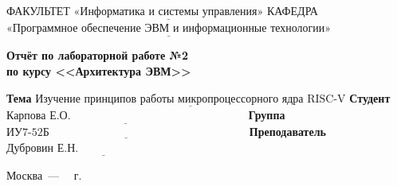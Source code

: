 \begin{titlepage}
	
	\noindent ФАКУЛЬТЕТ $\underline{\text{«Информатика и системы управления»}}$ \newline\newline
	\noindent КАФЕДРА $\underline{\text{«Программное обеспечение ЭВМ и информационные технологии»}}$\newline\newline\newline\newline\newline\newline\newline
	
	\vspace{\baselineskip}
	
	\begin{center}
		\noindent\begin{minipage}{0.81\textwidth}\centering
			\Large\textbf{Отчёт по лабораторной работе №2\\по курсу <<Архитектура ЭВМ>>}\newline\newline
		\end{minipage}
	\end{center}
	
	\noindent\textbf{Тема} $\underline{\text{Изучение принципов работы микропроцессорного ядра RISC-V}}$\newline\newline\newline
	\noindent\textbf{Студент} $\underline{\text{Карпова Е.О.~~~~~~~~~~~~~~~~~~~~~~~~~~~~~~~~~~~~~~~~~~~~~~~}}$\newline\newline
	\noindent\textbf{Группа} $\underline{\text{ИУ7-52Б~~~~~~~~~~~~~~~~~~~~~~~~~~~~~~~~~~~~~~~~~~~~~~~~~~~~~}}$\newline\newline
	\noindent\textbf{Преподаватель} $\underline{\text{Дубровин Е.Н.~~~~~~~~~~~~~~~~~~~~~~~~~~~~~~~~~}}$\newline
	
	\begin{center}
		\vfill
		Москва~---~\the\year
		~г.
	\end{center}
	\restoregeometry
\end{titlepage}

